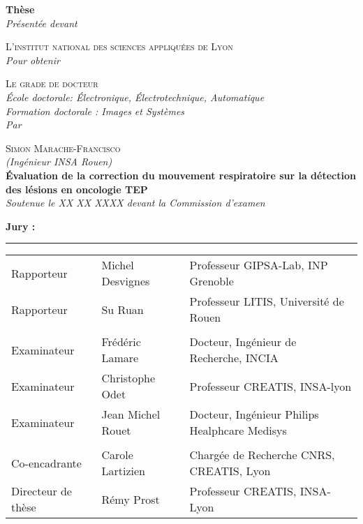 \begin{titlepage}

\begin{center}



\textbf{\Large Thèse}\\[0.5cm]

\textsl{\large Présentée devant}

\textsc{\large L’institut national des sciences appliquées de Lyon}\\[1.5cm]

\textsl{\large Pour obtenir}

\textsc{\large Le grade de docteur}\\[1.5cm]

\textsl{\large École doctorale: \'Electronique, \'Electrotechnique, Automatique}\\%
\textsl{\large Formation doctorale : Images et Systèmes}\\[1cm]
\textsl{\large Par}

\textsc{\large Simon Marache-Francisco}\\\textsl{(Ingénieur INSA Rouen)}\\[1.5cm]

\textbf{\LARGE \'Evaluation de la correction du mouvement respiratoire sur la détection des lésions en oncologie TEP}\\[1.5cm]

\textsl{\large Soutenue le XX XX XXXX devant la Commission d’examen}\\[1cm]

\vfill 

\begin{flushleft} \textbf{\Large Jury :} \end{flushleft}

\rule{\linewidth}{0.2 em}

\begin{tabular}{l l l}
Rapporteur 	& Michel Desvignes	&	Professeur GIPSA-Lab, INP Grenoble\\
Rapporteur 	& Su Ruan		&	Professeur LITIS, Université de Rouen\\
\\
Examinateur	& Frédéric Lamare	&	Docteur, Ingénieur de Recherche, INCIA\\
Examinateur	& Christophe Odet	&	Professeur CREATIS, INSA-lyon\\
Examinateur	& Jean Michel Rouet	&	Docteur, Ingénieur Philips Healphcare Medisys\\
\\
Co-encadrante	& Carole Lartizien	&	Chargée de Recherche CNRS, CREATIS, Lyon\\
Directeur de thèse& Rémy Prost		&	Professeur CREATIS, INSA-Lyon\\





\end{tabular}
\end{center}
\end{titlepage}
